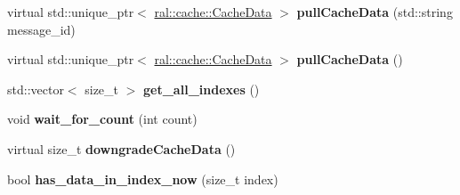 \begin{DoxyCompactItemize}
\mbox{\label{classral_1_1cache_1_1CacheMachine_a6acb39f2e7d87ea70e6bd1f51fc48bfe}} 
virtual std\+::unique\+\_\+ptr$<$ \hyperlink{classral_1_1cache_1_1CacheData}{ral\+::cache\+::\+Cache\+Data} $>$ {\bfseries pull\+Cache\+Data} (std\+::string message\+\_\+id)
\item 
\mbox{\label{classral_1_1cache_1_1CacheMachine_a64c08602e07aa3643c38b43672df1907}} 
virtual std\+::unique\+\_\+ptr$<$ \hyperlink{classral_1_1cache_1_1CacheData}{ral\+::cache\+::\+Cache\+Data} $>$ {\bfseries pull\+Cache\+Data} ()
\item 
\mbox{\label{classral_1_1cache_1_1CacheMachine_a0f16ba71e498e556dd34d48f21228298}} 
std\+::vector$<$ size\+\_\+t $>$ {\bfseries get\+\_\+all\+\_\+indexes} ()
\item 
\mbox{\label{classral_1_1cache_1_1CacheMachine_a5270712b7c7e754e596c52d1271d65fd}} 
void {\bfseries wait\+\_\+for\+\_\+count} (int count)
\item 
\mbox{\label{classral_1_1cache_1_1CacheMachine_a640d1b67c3810e5cf6d339c52975a3d5}} 
virtual size\+\_\+t {\bfseries downgrade\+Cache\+Data} ()
\item 
\mbox{\label{classral_1_1cache_1_1CacheMachine_ac78e7ee5b553c1ed405b26a221d3d5b5}} 
bool {\bfseries has\+\_\+data\+\_\+in\+\_\+index\+\_\+now} (size\+\_\+t index)
\end{DoxyCompactItemize}
